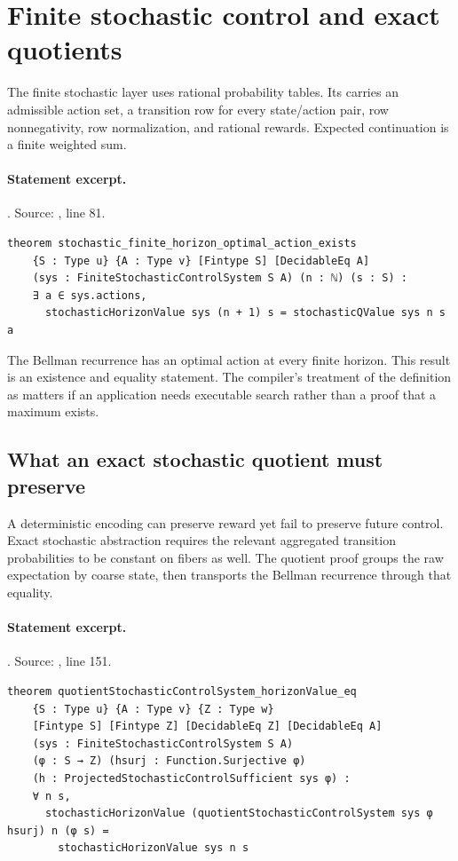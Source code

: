 \documentclass[11pt]{article}
\begin{document}
\section{Finite stochastic control and exact quotients}
The finite stochastic layer uses rational probability tables. Its
 carries an admissible action set, a
transition row for every state/action pair, row nonnegativity, row normalization,
and rational rewards. Expected continuation is a finite weighted sum.

\paragraph{Statement excerpt.}. Source: , line 81.
\begin{lstlisting}[style=AVOCSource]
theorem stochastic_finite_horizon_optimal_action_exists
    {S : Type u} {A : Type v} [Fintype S] [DecidableEq A]
    (sys : FiniteStochasticControlSystem S A) (n : ℕ) (s : S) :
    ∃ a ∈ sys.actions,
      stochasticHorizonValue sys (n + 1) s = stochasticQValue sys n s a
\end{lstlisting}


The Bellman recurrence has an optimal action at every finite horizon. This
result is an existence and equality statement. The compiler's treatment of the
definition as  matters if an application needs executable
search rather than a proof that a maximum exists.

\subsection{What an exact stochastic quotient must preserve}
A deterministic encoding can preserve reward yet fail to preserve future
control. Exact stochastic abstraction requires the relevant aggregated
transition probabilities to be constant on fibers as well. The quotient proof
groups the raw expectation by coarse state, then transports the Bellman
recurrence through that equality.

\paragraph{Statement excerpt.}. Source: , line 151.
\begin{lstlisting}[style=AVOCSource]
theorem quotientStochasticControlSystem_horizonValue_eq
    {S : Type u} {A : Type v} {Z : Type w}
    [Fintype S] [Fintype Z] [DecidableEq Z] [DecidableEq A]
    (sys : FiniteStochasticControlSystem S A)
    (φ : S → Z) (hsurj : Function.Surjective φ)
    (h : ProjectedStochasticControlSufficient sys φ) :
    ∀ n s,
      stochasticHorizonValue (quotientStochasticControlSystem sys φ hsurj) n (φ s) =
        stochasticHorizonValue sys n s
\end{lstlisting}
\end{document}
